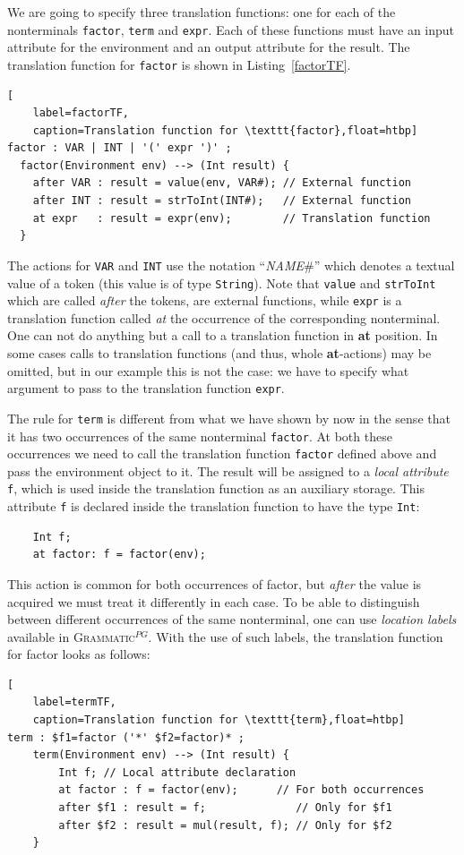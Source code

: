 \documentclass{informat} %
\newcommand{\lstref}[1]{Listing~\ref{#1}}
\newcommand{\ATF}{\textsc{Grammatic}$^{PG}$}
\begin{document}
We are going to specify three translation functions: one for each of the nonterminals \texttt{factor}, \texttt{term} and \texttt{expr}. Each of these functions must have an input attribute for the environment and an output attribute for the result. The translation function for \texttt{factor} is shown in \lstref{factorTF}.
\begin{lstlisting}[
	label=factorTF,
	caption=Translation function for \texttt{factor},float=htbp]
factor : VAR | INT | '(' expr ')' ;           
  factor(Environment env) --> (Int result) { 
    after VAR : result = value(env, VAR#); // External function 
    after INT : result = strToInt(INT#);   // External function
    at expr   : result = expr(env);        // Translation function
  }
\end{lstlisting}

The actions for \texttt{VAR} and \texttt{INT} use the notation ``\emph{NAME}\#'' which denotes a textual value of a token (this value is of type \texttt{String}). Note that \texttt{value} and \texttt{strToInt} which are called \emph{after} the tokens, are external functions, while \texttt{expr} is a translation function called \emph{at} the occurrence of the corresponding nonterminal. One can not do anything but a call to a translation function in \textbf{at} position. In some cases calls to translation functions (and thus, whole \textbf{at}-actions) may be omitted, but in our example this is not the case: we have to specify what argument to pass to the translation function \texttt{expr}.

The rule for \texttt{term} is different from what we have shown by now in the sense that it has two occurrences of the same nonterminal \texttt{factor}. At both these occurrences we need to call the translation function \texttt{factor} defined above and pass the environment object to it. The result will be assigned to a \emph{local attribute} \texttt{f}, which is used inside the translation function as an auxiliary storage. This attribute \texttt{f} is declared inside the translation function to have the type \texttt{Int}:
\begin{lstlisting}
	Int f;
	at factor: f = factor(env);
\end{lstlisting}
This action is common for both occurrences of factor, but \emph{after} the value is acquired we must treat it differently in each case. To be able to distinguish between different occurrences of the same nonterminal, one can use \emph{location labels} available in \ATF{}. With the use of such labels, the translation function for factor looks as follows:
\begin{lstlisting}[
	label=termTF,
	caption=Translation function for \texttt{term},float=htbp]
term : $f1=factor ('*' $f2=factor)* ;         
	term(Environment env) --> (Int result) {  
		Int f; // Local attribute declaration
		at factor : f = factor(env);      // For both occurrences
		after $f1 : result = f;              // Only for $f1
		after $f2 : result = mul(result, f); // Only for $f2
	}
\end{lstlisting}
\end{document}
